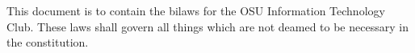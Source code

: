 \documentclass[12pt]{article}
\begin{document}
This document is to contain the bilaws for the OSU Information Technology Club. These laws shall govern all things which are not deamed to be necessary in the constitution.
\end{document}
